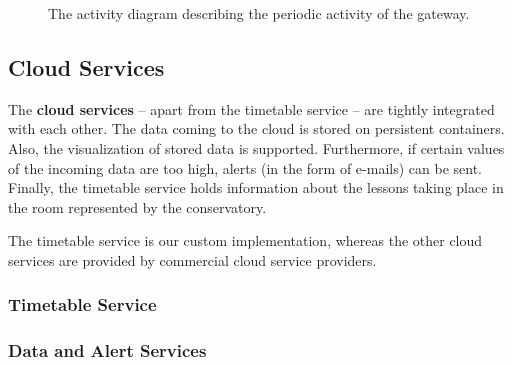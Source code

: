 \documentclass[a4paper, 11pt]{article}
\begin{document}
	\begin{figure}[h!]
		\center
		\caption{The activity diagram describing the periodic activity of the gateway.}
		\label{fig:activity}
	\end{figure}
	
	\subsection{Cloud Services}
	The \textbf{cloud services} -- apart from the timetable service -- are tightly integrated with each other. The data coming to the cloud is stored on persistent containers. Also, the visualization of stored data is supported. Furthermore, if certain values of the incoming data are too high, alerts (in the form of e-mails) can be sent. Finally, the timetable service holds information about the lessons taking place in the room represented by the conservatory.
	
	The timetable service is our custom implementation, whereas the other cloud services are provided by commercial cloud service providers.
	
	\subsubsection{Timetable Service}
	
	\subsubsection{Data and Alert Services}
	
\end{document}
